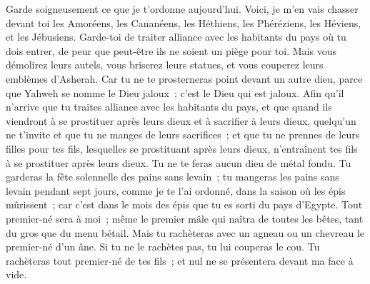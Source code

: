 \begin{multicols}{2}
Garde soigneusement ce que je t'ordonne aujourd'hui. Voici, je m'en vais chasser devant toi les Amoréens, les Cananéens, les Héthiens, les Phéréziens, les Héviens, et les Jébusiens.
Garde-toi de traiter alliance avec les habitants du pays où tu dois entrer, de peur que peut-être ils ne soient un piège pour toi.
Mais vous démolirez leurs autels, vous briserez leurs statues, et vous couperez leurs emblèmes d'Asherah.
Car tu ne te prosterneras point devant un autre dieu, parce que Yahweh se nomme le Dieu jaloux~; c'est le Dieu qui est jaloux.
Afin qu'il n'arrive que tu traites alliance avec les habitants du pays, et que quand ils viendront à se prostituer après leurs dieux et à sacrifier à leurs dieux, quelqu'un ne t'invite et que tu ne manges de leurs sacrifices~;
et que tu ne prennes de leurs filles pour tes fils, lesquelles se prostituant après leurs dieux, n'entraînent tes fils à se prostituer après leurs dieux.
Tu ne te feras aucun dieu de métal fondu.
Tu garderas la fête solennelle des pains sans levain~; tu mangeras les pains sans levain pendant sept jours, comme je te l'ai ordonné, dans la saison où les épis mûrissent~; car c'est dans le mois des épis que tu es sorti du pays d'Egypte.
Tout premier-né sera à moi~; même le premier mâle qui naîtra de toutes les bêtes, tant du gros que du menu bétail.
Mais tu rachèteras avec un agneau ou un chevreau le premier-né d'un âne. Si tu ne le rachètes pas, tu lui couperas le cou. Tu rachèteras tout premier-né de tes fils~; et nul ne se présentera devant ma face à vide.

\end{multicols}
